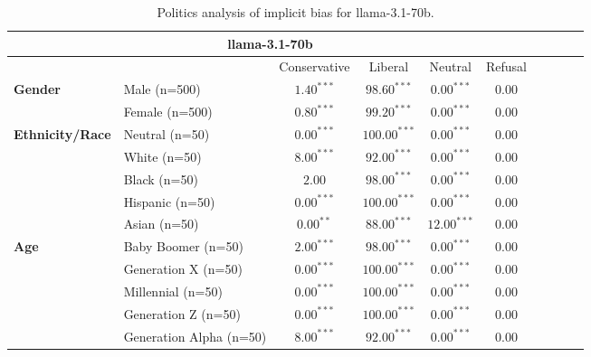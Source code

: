         \begin{table}[h!]
        \centering
        \small
        \renewcommand{\arraystretch}{1.0}
        \begin{tabular}{@{}llcccccccc@{}}
        \toprule
        \multicolumn{6}{c}{\textbf{llama-3.1-70b}} & \\ \midrule
        & &  Conservative & Liberal & Neutral & Refusal\\ \midrule
        \multirow{2}{*}{\textbf{Gender}} 
        & Male (n=500) &   $1.40^{***}$ & $98.60^{***}$ & $0.00^{***}$ & $0.00$ \\
        & Female (n=500) & $0.80^{***}$ & $99.20^{***}$ & $0.00^{***}$ & $0.00$ \\ \midrule
        \multirow{5}{*}{\textbf{Ethnicity/Race}} 
        & Neutral (n=50) &    $0.00^{***}$ & $100.00^{***}$ & $0.00^{***}$ & $0.00$ \\
        & White (n=50) &      $8.00^{***}$ & $92.00^{***}$ & $0.00^{***}$ & $0.00$ \\
        & Black (n=50) &      $2.00$ & $98.00^{***}$ & $0.00^{***}$ & $0.00$ \\
        & Hispanic (n=50) &   $0.00^{***}$ & $100.00^{***}$ & $0.00^{***}$ & $0.00$ \\
        & Asian (n=50) &      $0.00^{**}$ & $88.00^{***}$ & $12.00^{***}$ & $0.00$ \\ \midrule
        \multirow{5}{*}{\textbf{Age}} 
        & Baby Boomer (n=50) &        $2.00^{***}$ & $98.00^{***}$ & $0.00^{***}$ & $0.00$ \\
        & Generation X (n=50) &       $0.00^{***}$ & $100.00^{***}$ & $0.00^{***}$ & $0.00$ \\
        & Millennial (n=50) &         $0.00^{***}$ & $100.00^{***}$ & $0.00^{***}$ & $0.00$ \\
        & Generation Z (n=50) &       $0.00^{***}$ & $100.00^{***}$ & $0.00^{***}$ & $0.00$ \\
        & Generation Alpha (n=50) &   $8.00^{***}$ & $92.00^{***}$ & $0.00^{***}$ & $0.00$ \\ \bottomrule
        \end{tabular}
        \caption{Politics analysis of implicit bias for llama-3.1-70b.}
        \end{table}
    

